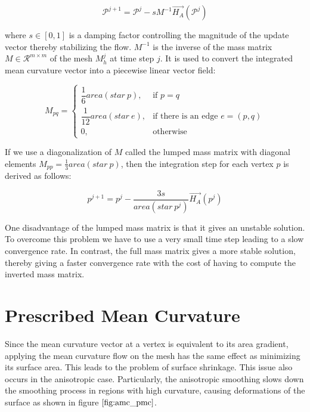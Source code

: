 \documentclass[11pt]{article}
\begin{document}
\begin{equation}
\mathcal{P}^{j+1} = \mathcal{P}^j -sM^{-1}\vec{H_A}(\mathcal{P}^j)
\end{equation}

where $s \in [0, 1]$ is a damping factor controlling the magnitude of the update vector thereby stabilizing the flow. $M^{-1}$ is the inverse of the mass matrix $M \in \mathcal{R}^{m \times m}$ of the mesh $M^j_h$ at time step $j$. It is used to convert the integrated mean curvature vector into a piecewise linear vector field:

\begin{equation}
M_{pq} = 
\begin{cases} \dfrac{1}{6}area(star\ p), & \mbox{if } p=q \\ 
\dfrac{1}{12}area(star\ e), & \mbox{if there is an edge } e=(p, q) \\
0, & \mbox{otherwise} \end{cases}
\label{eq:mass_matrix}
\end{equation}

If we use a diagonalization of $M$ called the lumped mass matrix with diagonal elements $M_{pp} = \frac{1}{3} area(star\ p)$, then the integration step for each vertex $p$ is derived as follows:

\begin{equation}
p^{j+1} = p^{j} - \dfrac{3s}{area(star\ p^j)}\vec{H_A}(p^j)
\end{equation}

One disadvantage of the lumped mass matrix is that it gives an unstable solution. To overcome this problem we have to use a very small time step leading to a slow convergence rate. In contrast, the full mass matrix gives a more stable solution, thereby giving a faster convergence rate with the cost of having to compute the inverted mass matrix.

\section{Prescribed Mean Curvature}

Since the mean curvature vector at a vertex is equivalent to its area gradient, applying the mean curvature flow on the mesh has the same effect as minimizing its surface area. This leads to the problem of surface shrinkage. This issue also occurs in the anisotropic case. Particularly, the anisotropic smoothing slows down the smoothing process in regions with high curvature, causing
deformations of the surface as shown in figure $\ref{fig:amc_pmc}$.
\end{document}
